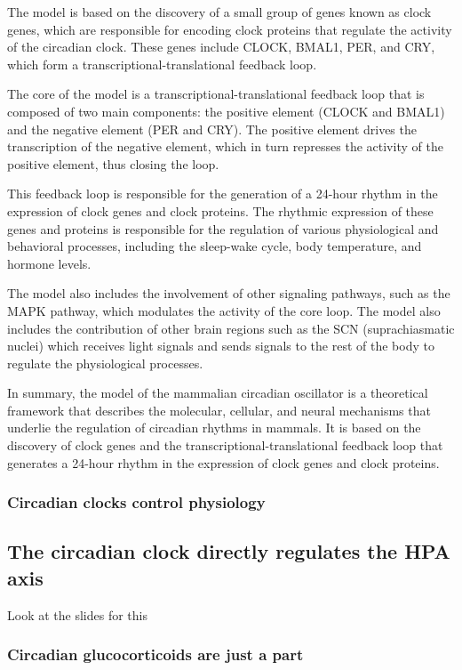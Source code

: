 \begin{itemize}
\begin{itemize}
The model is based on the discovery of a small group of genes known as clock genes, which are responsible for encoding clock proteins that regulate the activity of the circadian clock. These genes include CLOCK, BMAL1, PER, and CRY, which form a transcriptional-translational feedback loop.

The core of the model is a transcriptional-translational feedback loop that is composed of two main components: the positive element (CLOCK and BMAL1) and the negative element (PER and CRY). The positive element drives the transcription of the negative element, which in turn represses the activity of the positive element, thus closing the loop.

This feedback loop is responsible for the generation of a 24-hour rhythm in the expression of clock genes and clock proteins. The rhythmic expression of these genes and proteins is responsible for the regulation of various physiological and behavioral processes, including the sleep-wake cycle, body temperature, and hormone levels.

The model also includes the involvement of other signaling pathways, such as the MAPK pathway, which modulates the activity of the core loop. The model also includes the contribution of other brain regions such as the SCN (suprachiasmatic nuclei) which receives light signals and sends signals to the rest of the body to regulate the physiological processes.

In summary, the model of the mammalian circadian oscillator is a theoretical framework that describes the molecular, cellular, and neural mechanisms that underlie the regulation of circadian rhythms in mammals. It is based on the discovery of clock genes and the transcriptional-translational feedback loop that generates a 24-hour rhythm in the expression of clock genes and clock proteins.
\subsubsection{Circadian clocks control physiology}
\subsection{The circadian clock directly regulates the HPA axis}
Look at the slides for this

\subsubsection{Circadian glucocorticoids are just a part}

\end{itemize}
\end{itemize}
